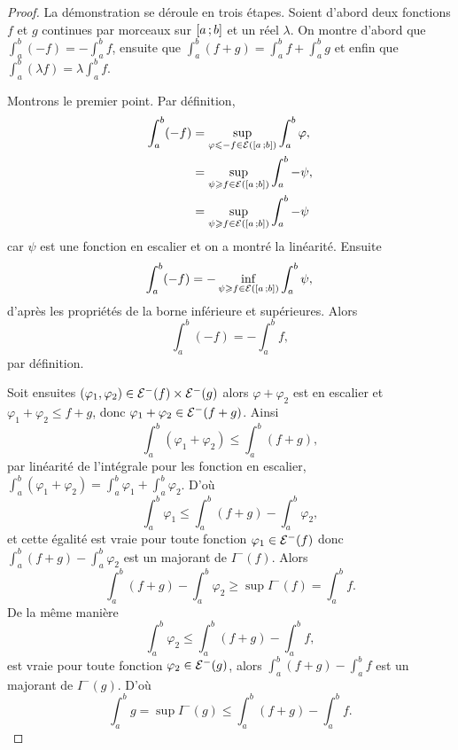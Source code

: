 \begin{proof}
  La démonstration se déroule en trois étapes. Soient d'abord deux fonctions $f$ et $g$ continues par morceaux sur $\left[ a \, ;  b \right]$ et un réel $\lambda$. On montre d'abord que $\int_a^b (-f) = -\int_a^b f$, ensuite que $\int_a^b (f+g) = \int_a^b f + \int_a^b g$ et enfin que $\int_a^b (\lambda f) = \lambda \int_a^b f$.

Montrons le premier point. Par définition,
\begin{align}
  \int_a^b (-f) &= \sup\limits_{\varphi \leqslant -f \in \mathcal{E}(\left[ a \, ;  b \right])} \int_a^b \varphi ,\\
  &= \sup\limits_{\psi \geqslant f \in \mathcal{E}(\left[ a \, ;  b \right])} \int_a^b -\psi ,\\
  &= \sup\limits_{\psi \geqslant f \in \mathcal{E}(\left[ a \, ;  b \right])} \int_a^b -\psi 
\end{align}
car $\psi$ est une fonction en escalier et on a montré la linéarité. Ensuite
\begin{equation}
  \int_a^b (-f) = -\inf\limits_{\psi \geqslant f \in \mathcal{E}(\left[ a \, ;  b \right])} \int_a^b \psi ,\\
\end{equation}
d'après les propriétés de la borne inférieure et supérieures. Alors
\begin{equation}
   \int_a^b (-f) = -\int_a^b f,
\end{equation}
par définition.

Soit ensuites $(\varphi_1, \varphi_2) \in \mathcal{E}^{-}(f) \times \mathcal{E}^{-}(g)$ alors $\varphi+\varphi_2$ est en escalier et $\varphi_1+\varphi_2 \leqslant f+g$, donc $\varphi_1+\varphi_2 \in \mathcal{E}^{-}(f+g)$. Ainsi
\begin{equation}
  \int_a^b (\varphi_1+\varphi_2) \leqslant \int_a^b (f+g),
\end{equation}
par linéarité de l'intégrale pour les fonction en escalier, $\int_a^b (\varphi_1+\varphi_2) = \int_a^b \varphi_1 + \int_a^b \varphi_2$. D'où
\begin{equation}
  \int_a^b \varphi_1 \leqslant \int_a^b (f+g) - \int_a^b \varphi_2,
\end{equation}
et cette égalité est vraie pour toute fonction $\varphi_1 \in \mathcal{E}^{-}(f)$ donc $\int_a^b (f+g) - \int_a^b \varphi_2$ est un majorant de $I^{-}(f)$. Alors
\begin{equation}
  \int_a^b (f+g) - \int_a^b \varphi_2 \geqslant \sup I^{-}(f) = \int_a^b f.
\end{equation}
De la même manière
\begin{equation}
  \int_a^b \varphi_2 \leqslant \int_a^b (f+g) - \int_a^b f,
\end{equation}
est vraie pour toute fonction $\varphi_2 \in \mathcal{E}^{-}(g)$, alors $\int_a^b (f+g) - \int_a^b f$ est un majorant de $I^{-}(g)$. D'où
\begin{equation}
  \int_a^b g = \sup I^{-}(g) \leqslant \int_a^b (f+g) - \int_a^b f.
\end{equation}


\end{proof}
